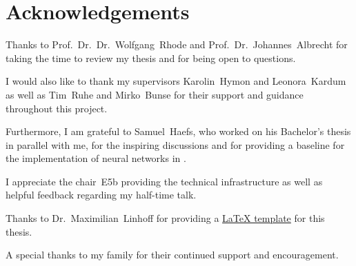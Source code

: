 \chapter*{Acknowledgements}

Thanks to
  Prof.~Dr.~Dr.~Wolfgang~Rhode and
  Prof.~Dr.~Johannes~Albrecht
  for taking the time to review my thesis
  and for being open to questions.

I would also like to thank
my supervisors
  Karolin~Hymon and
  Leonora~Kardum
as well as
  Tim~Ruhe and
  Mirko~Bunse
for their support and guidance throughout this project.

Furthermore,
I am grateful to Samuel~Haefs,
  who worked on his Bachelor's thesis in parallel with me,
for the inspiring discussions
and for providing a baseline for the implementation of neural networks in \dsea{}.

I appreciate the chair~E5b providing
  the technical infrastructure
  as well as helpful feedback
    regarding my half-time talk.

Thanks to Dr.~Maximilian~Linhoff for providing a \href{https://github.com/maxnoe/tudothesis}{\LaTeX{} template} for this thesis.

A special thanks to my family for their continued support and encouragement.

